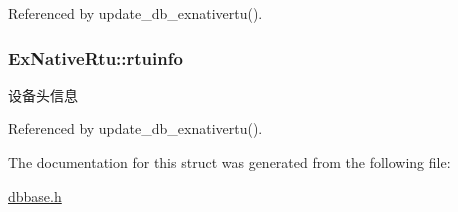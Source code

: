 Referenced by update\-\_\-db\-\_\-exnativertu().

\hypertarget{structExNativeRtu_a880cf200ec393f75b6a72b3a47b8af88}{
\subsubsection[{rtuinfo}]{ Ex\-Native\-Rtu\-::rtuinfo}}\label{structExNativeRtu_a880cf200ec393f75b6a72b3a47b8af88}


设备头信息 



Referenced by update\-\_\-db\-\_\-exnativertu().



The documentation for this struct was generated from the following file\-:\begin{DoxyCompactItemize}
\item 
\hyperlink{dbbase_8h}{dbbase.\-h}\end{DoxyCompactItemize}
